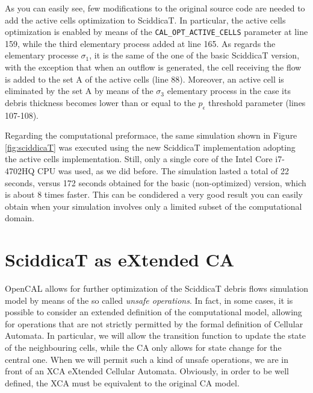 
  




As you can easily see, few modifications to the original source code
are needed to add the active cells optimization to SciddicaT. In
particular, the active cells optimization is enabled by means of the
\verb'CAL_OPT_ACTIVE_CELLS' parameter at line 159, while the third
elementary process added at line 165. As regards the elementary
processe $\sigma_1$, it is the same of the one of the basic SciddicaT
version, with the exception that when an outflow is generated, the
cell receiving the flow is added to the set A of the active cells
(line 88). Moreover, an active cell is eliminated by the set A by
means of the $\sigma_3$ elementary process in the case its debris
thickness becomes lower than or equal to the $p_\epsilon$ threshold
parameter (lines 107-108).

Regarding the computational preformace, the same simulation shown in
Figure \ref{fig:sciddicaT} was executed using the new SciddicaT
implementation adopting the active cells implementation. Still, only a
single core of the Intel Core i7-4702HQ CPU was used, as we did
before. The simulation lasted a total of 22 seconds, versus 172
seconds obtained for the basic (non-optimized) version, which is about
8 times faster. This can be condidered a very good result you can
easily obtain when your simulation involves only a limited subset of
the computational domain.

\section{SciddicaT as eXtended CA}\label{sec:sciddicaT_extended}
OpenCAL allows for further optimization of the SciddicaT debris flows
simulation model by means of the so called \emph{unsafe
  operations}. In fact, in some cases, it is possible to consider an
extended definition of the computational model, allowing for
operations that are not strictly permitted by the formal definition of
Cellular Automata. In particular, we will allow the transition
function to update the state of the neighbouring cells, while the CA
only allows for state change for the central one. When we will permit
such a kind of unsafe operations, we are in front of an XCA eXtended
Cellular Automata. Obviously, in order to be well defined, the XCA
must be equivalent to the original CA model.

